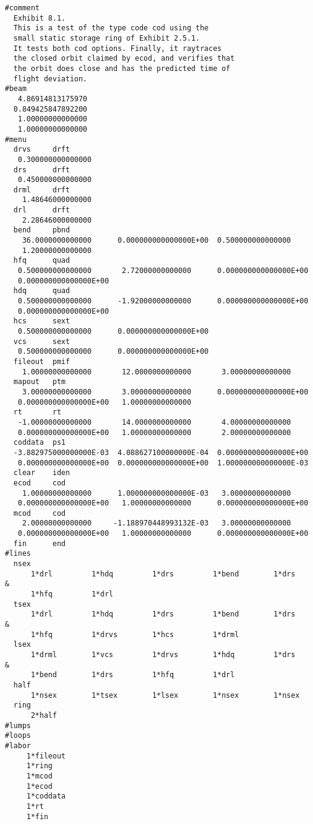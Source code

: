 \vspace{5mm}
\begin{footnotesize}
\begin{verbatim}
#comment
  Exhibit 8.1.
  This is a test of the type code cod using the
  small static storage ring of Exhibit 2.5.1.
  It tests both cod options. Finally, it raytraces
  the closed orbit claimed by ecod, and verifies that
  the orbit does close and has the predicted time of
  flight deviation.
#beam
   4.86914813175970
  0.849425847892200
   1.00000000000000
   1.00000000000000
#menu
  drvs     drft
   0.300000000000000
  drs      drft
   0.450000000000000
  drml     drft
    1.48646000000000
  drl      drft
    2.28646000000000
  bend     pbnd
    36.0000000000000      0.000000000000000E+00  0.500000000000000
    1.20000000000000
  hfq      quad
   0.500000000000000       2.72000000000000      0.000000000000000E+00
   0.000000000000000E+00
  hdq      quad
   0.500000000000000      -1.92000000000000      0.000000000000000E+00
   0.000000000000000E+00
  hcs      sext
   0.500000000000000      0.000000000000000E+00
  vcs      sext
   0.500000000000000      0.000000000000000E+00
  fileout  pmif
    1.00000000000000       12.0000000000000       3.00000000000000
  mapout   ptm
    3.00000000000000       3.00000000000000      0.000000000000000E+00
   0.000000000000000E+00   1.00000000000000
  rt       rt
   -1.00000000000000       14.0000000000000       4.00000000000000
   0.000000000000000E+00   1.00000000000000       2.00000000000000
  coddata  ps1
  -3.882975000000000E-03  4.088627100000000E-04  0.000000000000000E+00
   0.000000000000000E+00  0.000000000000000E+00  1.000000000000000E-03
  clear    iden
  ecod     cod
    1.00000000000000      1.000000000000000E-03   3.00000000000000
   0.000000000000000E+00   1.00000000000000      0.000000000000000E+00
  mcod     cod
    2.00000000000000     -1.188970448993132E-03   3.00000000000000
   0.000000000000000E+00   1.00000000000000      0.000000000000000E+00
  fin      end
#lines
  nsex
      1*drl         1*hdq         1*drs         1*bend        1*drs      &
      1*hfq         1*drl
  tsex
      1*drl         1*hdq         1*drs         1*bend        1*drs      &
      1*hfq         1*drvs        1*hcs         1*drml
  lsex
      1*drml        1*vcs         1*drvs        1*hdq         1*drs      &
      1*bend        1*drs         1*hfq         1*drl
  half
      1*nsex        1*tsex        1*lsex        1*nsex        1*nsex
  ring
      2*half
#lumps
#loops
#labor
     1*fileout
     1*ring
     1*mcod
     1*ecod
     1*coddata
     1*rt
     1*fin


\end{verbatim}
\end{footnotesize}
